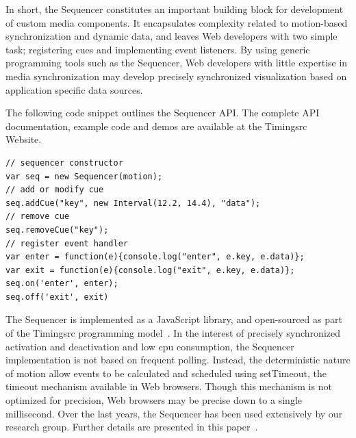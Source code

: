 In short, the Sequencer constitutes an important building block for
development of custom media components. It encapsulates complexity related to
motion-based synchronization and dynamic data, and leaves Web developers with
two simple task; registering cues and implementing event listeners. By using
generic programming tools such as the Sequencer,  Web developers with little
expertise in media synchronization may develop precisely synchronized
visualization based on application specific data sources.

The following code snippet outlines the Sequencer API. The
complete API documentation, example code and demos are available at the
Timingsrc~\cite{timingsrc} Website.

\begin{lstlisting}[caption=Sequencer usage example]
// sequencer constructor
var seq = new Sequencer(motion);
// add or modify cue
seq.addCue("key", new Interval(12.2, 14.4), "data");
// remove cue
seq.removeCue("key");
// register event handler
var enter = function(e){console.log("enter", e.key, e.data)};
var exit = function(e){console.log("exit", e.key, e.data)};
seq.on('enter', enter);
seq.off('exit', exit)
\end{lstlisting}


The Sequencer is implemented as a JavaScript library, and open-sourced as part
of the Timingsrc programming model~\cite{timingsrc}. In the interest of
precisely synchronized activation and deactivation and low cpu consumption,
the Sequencer implementation is not based on frequent polling. Instead, the
deterministic nature of motion allow events to be calculated and scheduled
using setTimeout, the timeout mechanism available in Web browsers. Though this
mechanism is not optimized for precision, Web browsers may be precise down to
a single millisecond. Over the last years, the Sequencer has been used
extensively by our research group. Further details are presented in this
paper~\cite{sequencer}.



